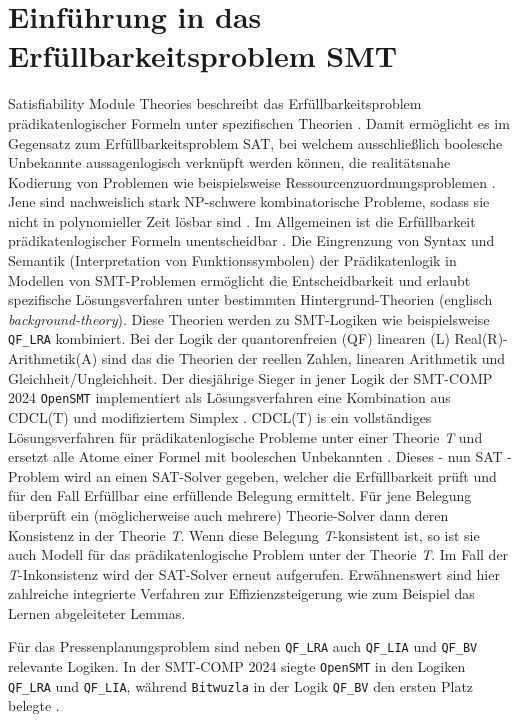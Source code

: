 \section{Einführung in das Erfüllbarkeitsproblem SMT}
Satisfiability Module Theories beschreibt das Erfüllbarkeitsproblem prädikatenlogischer Formeln unter spezifischen Theorien \cite{smt}.
Damit ermöglicht es im Gegensatz zum Erfüllbarkeitsproblem SAT, bei welchem ausschließlich boolesche Unbekannte aussagenlogisch verknüpft werden können,
die realitätsnahe Kodierung von Problemen wie beispielsweise Ressourcenzuordnungsproblemen \cite{rcpsp}.
Jene sind nachweislich stark NP-schwere kombinatorische Probleme, sodass sie nicht in polynomieller Zeit lösbar sind \cite{rcpspnp}.
Im Allgemeinen ist die Erfüllbarkeit prädikatenlogischer Formeln unentscheidbar \cite{smt}.
Die Eingrenzung von Syntax und Semantik (Interpretation von Funktionssymbolen) der Prädikatenlogik in Modellen von SMT-Problemen
ermöglicht die Entscheidbarkeit und erlaubt spezifische Lösungsverfahren unter bestimmten Hintergrund-Theorien (englisch \textit{background-theory}).
Diese Theorien werden zu SMT-Logiken wie beispielsweise \texttt{QF\_LRA} kombiniert.
Bei der Logik der quantorenfreien (QF) linearen (L) Real(R)-Arithmetik(A) sind das die Theorien der reellen Zahlen, linearen Arithmetik und Gleichheit/Ungleichheit.
Der diesjährige Sieger in jener Logik der SMT-COMP 2024 \texttt{OpenSMT} \cite{smtcomp2024results} implementiert als Lösungsverfahren eine Kombination aus CDCL(T) und modifiziertem Simplex \cite{opensmt}.
CDCL(T) is ein vollständiges Lösungsverfahren für prädikatenlogische Probleme unter einer Theorie \textit{T} und ersetzt alle Atome einer Formel mit booleschen Unbekannten \cite{smt}.
Dieses - nun SAT - Problem wird an einen SAT-Solver gegeben, welcher die Erfüllbarkeit prüft und für den Fall Erfüllbar eine erfüllende Belegung ermittelt.
Für jene Belegung überprüft ein (möglicherweise auch mehrere) Theorie-Solver dann deren Konsistenz in der Theorie \textit{T}.
Wenn diese Belegung \textit{T}-konsistent ist, so ist sie auch Modell für das prädikatenlogische Problem unter der Theorie \textit{T}.
Im Fall der \textit{T}-Inkonsistenz wird der SAT-Solver erneut aufgerufen.
Erwähnenswert sind hier zahlreiche integrierte Verfahren zur Effizienzsteigerung wie zum Beispiel das Lernen abgeleiteter Lemmas.

Für das Pressenplanungsproblem sind neben \texttt{QF\_LRA} auch \texttt{QF\_LIA} und \texttt{QF\_BV} relevante Logiken.
In der SMT-COMP 2024 siegte \texttt{OpenSMT} in den Logiken \texttt{QF\_LRA} und \texttt{QF\_LIA}, während \texttt{Bitwuzla} in der Logik \texttt{QF\_BV} den ersten Platz belegte \cite{smtcomp2024results}.

